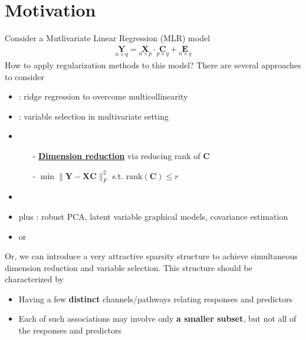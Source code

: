 \documentclass[twoside]{article}
\begin{document}

\section{Motivation}
Consider a Mutlivariate Linear Regression (MLR) model
\begin{align*}
    \underset{n\times q}{\mathbf{Y}} = \underset{n\times p}{\mathbf{X}} \cdot \underset{p\times q}{\mathbf{C}}+ \underset{n\times q}{\mathbf{E}}
\end{align*}
How to apply regularization methods to this model? There are several approaches to consider 
\begin{itemize}
    \item {}: ridge regression to overcome multicollinearity
    \item {}: variable selection in multivariate setting 
    \item {}
    \begin{itemize}
        \item[-] \textbf{\underline{Dimension reduction}} via reducing rank of $\mathbf{C}$
        \item[-] $\min \lVert \mathbf{Y}-\mathbf{XC} \rVert^2_F$ s.t. $\mathrm{rank}(\mathbf{C})\leq r$  
    \end{itemize}
    \item {}
    \item {} plus : robust PCA, latent variable graphical models, covariance estimation 
    \item {} or 
\end{itemize}
Or, we can introduce a very attractive sparsity structure to achieve simultaneous dimension reduction and variable selection. This structure should be characterized by
\begin{itemize}
    \item Having a few \textbf{distinct} channels/pathways relating responses and predictors
    \item Each of such associations may involve only \textbf{a smaller subset}, but not all of the responses and predictors  
\end{itemize}
\end{document}
